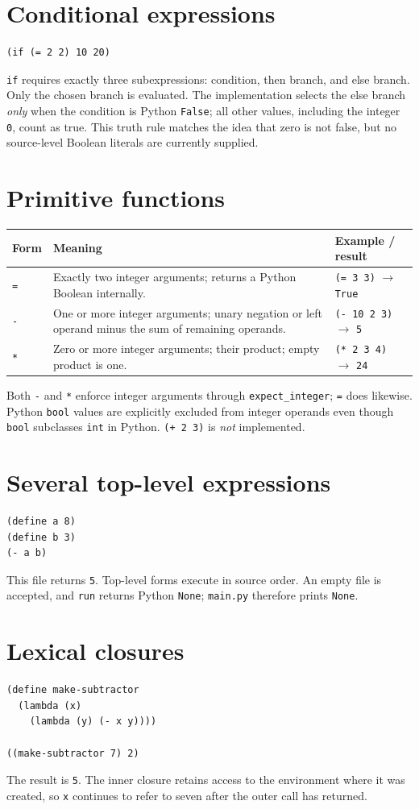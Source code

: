 \documentclass[11pt,a4paper,oneside]{report}
\begin{document}
\section{Conditional expressions}
\begin{lstlisting}
(if (= 2 2) 10 20)
\end{lstlisting}
\texttt{if} requires exactly three subexpressions: condition, then branch, and else branch. Only the chosen branch is evaluated. The implementation selects the else branch \emph{only} when the condition is Python \texttt{False}; all other values, including the integer \texttt{0}, count as true. This truth rule matches the idea that zero is not false, but no source-level Boolean literals are currently supplied.
\section{Primitive functions}
\begin{longtable}{p{}p{}p{}}\toprule Form & Meaning & Example / result\\\midrule\endhead
\texttt{=} & Exactly two integer arguments; returns a Python Boolean internally. & \texttt{(= 3 3)} $\rightarrow$ \texttt{True}\\
\texttt{-} & One or more integer arguments; unary negation or left operand minus the sum of remaining operands. & \texttt{(- 10 2 3)} $\rightarrow$ \texttt{5}\\
\texttt{*} & Zero or more integer arguments; their product; empty product is one. & \texttt{(* 2 3 4)} $\rightarrow$ \texttt{24}\\\bottomrule
\end{longtable}
Both \texttt{-} and \texttt{*} enforce integer arguments through \texttt{expect\_integer}; \texttt{=} does likewise. Python \texttt{bool} values are explicitly excluded from integer operands even though \texttt{bool} subclasses \texttt{int} in Python. \texttt{(+ 2 3)} is \emph{not} implemented.
\section{Several top-level expressions}
\begin{lstlisting}
(define a 8)
(define b 3)
(- a b)
\end{lstlisting}
This file returns \texttt{5}. Top-level forms execute in source order. An empty file is accepted, and \texttt{run} returns Python \texttt{None}; \texttt{main.py} therefore prints \texttt{None}.
\section{Lexical closures}
\begin{lstlisting}
(define make-subtractor
  (lambda (x)
    (lambda (y) (- x y))))

((make-subtractor 7) 2)
\end{lstlisting}
The result is \texttt{5}. The inner closure retains access to the environment where it was created, so \texttt{x} continues to refer to seven after the outer call has returned.
\end{document}
